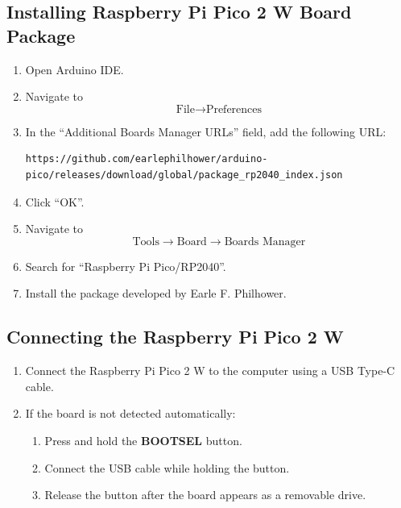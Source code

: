 \documentclass[12pt,a4paper]{article}
\begin{document}
\subsection{Installing Raspberry Pi Pico 2 W Board Package}

\begin{enumerate}
    \item Open Arduino IDE.
    \item Navigate to
    \[
    \text{File} \rightarrow \text{Preferences}
    \]
    
    \item In the ``Additional Boards Manager URLs'' field, add the following URL:
    
\begin{verbatim}
https://github.com/earlephilhower/arduino-pico/releases/download/global/package_rp2040_index.json
\end{verbatim}

    \item Click ``OK''.
    
    \item Navigate to
    \[
    \text{Tools} \rightarrow \text{Board} \rightarrow \text{Boards Manager}
    \]

    \item Search for ``Raspberry Pi Pico/RP2040''.

    \item Install the package developed by Earle F. Philhower.
\end{enumerate}

\subsection{Connecting the Raspberry Pi Pico 2 W}

\begin{enumerate}
    \item Connect the Raspberry Pi Pico 2 W to the computer using a USB Type-C cable.
    
    \item If the board is not detected automatically:
    \begin{enumerate}
        \item Press and hold the \textbf{BOOTSEL} button.
        \item Connect the USB cable while holding the button.
        \item Release the button after the board appears as a removable drive.
    \end{enumerate}
\end{enumerate}
\end{document}

